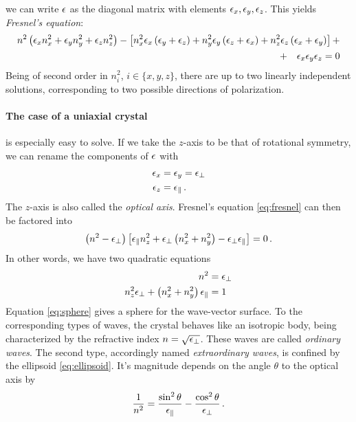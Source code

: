 we can write $\mathbf{\epsilon}$ as the diagonal matrix with elements $\epsilon_x, \epsilon_y, \epsilon_z$. 
This yields \emph{Fresnel's equation}:
\begin{align}
    n^2 \left(\epsilon_x n_x^2 + \epsilon_y n_y^2 + \epsilon_z n_z^2 \right) 
    - \left[
        n_x^2 \epsilon_x \left(\epsilon_y + \epsilon_z\right) + 
        n_y^2 \epsilon_y \left(\epsilon_z + \epsilon_x\right) + 
        n_z^2 \epsilon_z \left(\epsilon_x + \epsilon_y\right) 
    \right] + \nonumber \\
    + \quad \epsilon_x \epsilon_y \epsilon_z = 0
    \label{eq:fresnel}
\end{align}
Being of second order in $n_i^2$, $i \in \{x, y, z\}$, there are up to two linearly 
independent solutions, corresponding to two possible directions of polarization. 


\paragraph{The case of a uniaxial crystal} 
is especially easy to solve. 
If we take the $z$-axis to be that of rotational symmetry, 
we can rename the components of 
$\mathbf{\epsilon}$ with 
\begin{align}
\epsilon_x &= \epsilon_y = \epsilon_\perp 
\label{eq:eps_perp}\\
\epsilon_z &= \epsilon_\parallel \, .
\label{eq:eps_parallel}
\end{align}
The $z$-axis is also called the \emph{optical axis}.
Fresnel's equation \eqref{eq:fresnel} can then be factored into
\begin{equation}
    \left(n^2 - \epsilon_\perp\right) 
    \left[\epsilon_\parallel n_z^2 + 
        \epsilon_\perp \left(n_x^2 + n_y^2\right) -
        \epsilon_\perp \epsilon_\parallel 
    \right] = 0 \, .
\end{equation}
In other words, we have two quadratic equations
\begin{align}
    n^2 &= \epsilon_\perp
    \label{eq:sphere} \\
    n_z^2 \epsilon_\perp + \left(n_x^2 + n_y^2\right) \epsilon_\parallel &= 1
    \label{eq:ellipsoid}
\end{align}
Equation \eqref{eq:sphere} gives a sphere for the wave-vector surface. To the 
corresponding types of waves, the crystal behaves like an isotropic body, being 
characterized by the refractive index $n = \sqrt{\epsilon_\perp}$. These waves are 
called \emph{ordinary waves}. The second type, accordingly named 
\emph{extraordinary waves}, is confined by the ellipsoid \eqref{eq:ellipsoid}. 
It's magnitude depends on 
the angle $\theta$ to the optical axis by 
\begin{equation}
    \frac{1}{n^2} =  \frac{\sin^2 \theta}{\epsilon_\parallel} - 
        \frac{\cos^2 \theta}{\epsilon_\perp} \, .
    \label{eq:theta}
\end{equation}


